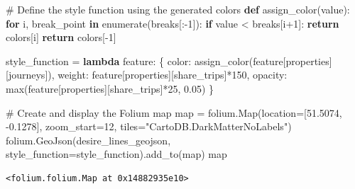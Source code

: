 \documentclass[
  letterpaper,
  DIV=11,
  numbers=noendperiod]{scrreprt}
\newenvironment{Shaded}{\begin{snugshade}}{\end{snugshade}}
\newcommand{\BuiltInTok}[1]{\textcolor[rgb]{0.00,0.23,0.31}{#1}}
\newcommand{\CommentTok}[1]{\textcolor[rgb]{0.37,0.37,0.37}{#1}}
\newcommand{\ControlFlowTok}[1]{\textcolor[rgb]{0.00,0.23,0.31}{\textbf{#1}}}
\newcommand{\DecValTok}[1]{\textcolor[rgb]{0.68,0.00,0.00}{#1}}
\newcommand{\FloatTok}[1]{\textcolor[rgb]{0.68,0.00,0.00}{#1}}
\newcommand{\KeywordTok}[1]{\textcolor[rgb]{0.00,0.23,0.31}{\textbf{#1}}}
\newcommand{\NormalTok}[1]{\textcolor[rgb]{0.00,0.23,0.31}{#1}}
\newcommand{\OperatorTok}[1]{\textcolor[rgb]{0.37,0.37,0.37}{#1}}
\newcommand{\StringTok}[1]{\textcolor[rgb]{0.13,0.47,0.30}{#1}}
\begin{document}
\begin{Shaded}
\begin{Highlighting}[]
\CommentTok{\# Define the style function using the generated colors}
\KeywordTok{def}\NormalTok{ assign\_color(value):}
    \ControlFlowTok{for}\NormalTok{ i, break\_point }\KeywordTok{in} \BuiltInTok{enumerate}\NormalTok{(breaks[:}\OperatorTok{{-}}\DecValTok{1}\NormalTok{]):}
        \ControlFlowTok{if}\NormalTok{ value }\OperatorTok{\textless{}}\NormalTok{ breaks[i}\OperatorTok{+}\DecValTok{1}\NormalTok{]:}
            \ControlFlowTok{return}\NormalTok{ colors[i]}
    \ControlFlowTok{return}\NormalTok{ colors[}\OperatorTok{{-}}\DecValTok{1}\NormalTok{]}

\NormalTok{style\_function }\OperatorTok{=} \KeywordTok{lambda}\NormalTok{ feature: \{}
    \StringTok{\textquotesingle{}color\textquotesingle{}}\NormalTok{: assign\_color(feature[}\StringTok{\textquotesingle{}properties\textquotesingle{}}\NormalTok{][}\StringTok{\textquotesingle{}journeys\textquotesingle{}}\NormalTok{]),}
    \StringTok{\textquotesingle{}weight\textquotesingle{}}\NormalTok{: feature[}\StringTok{\textquotesingle{}properties\textquotesingle{}}\NormalTok{][}\StringTok{\textquotesingle{}share\_trips\textquotesingle{}}\NormalTok{]}\OperatorTok{*}\DecValTok{150}\NormalTok{,  }
    \StringTok{\textquotesingle{}opacity\textquotesingle{}}\NormalTok{: }\BuiltInTok{max}\NormalTok{(feature[}\StringTok{\textquotesingle{}properties\textquotesingle{}}\NormalTok{][}\StringTok{\textquotesingle{}share\_trips\textquotesingle{}}\NormalTok{]}\OperatorTok{*}\DecValTok{25}\NormalTok{, }\FloatTok{0.05}\NormalTok{)}
\NormalTok{\}}
\end{Highlighting}
\end{Shaded}

\begin{Shaded}
\begin{Highlighting}[]
\CommentTok{\# Create and display the Folium map}
\BuiltInTok{map} \OperatorTok{=}\NormalTok{ folium.Map(location}\OperatorTok{=}\NormalTok{[}\FloatTok{51.5074}\NormalTok{, }\OperatorTok{{-}}\FloatTok{0.1278}\NormalTok{], zoom\_start}\OperatorTok{=}\DecValTok{12}\NormalTok{, tiles}\OperatorTok{=}\StringTok{"CartoDB.DarkMatterNoLabels"}\NormalTok{)}
\NormalTok{folium.GeoJson(desire\_lines\_geojson, style\_function}\OperatorTok{=}\NormalTok{style\_function).add\_to(}\BuiltInTok{map}\NormalTok{)}
\BuiltInTok{map}
\end{Highlighting}
\end{Shaded}

\begin{verbatim}
<folium.folium.Map at 0x14882935e10>
\end{verbatim}
\end{document}
